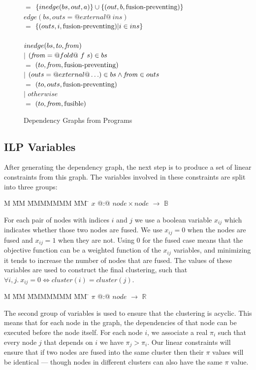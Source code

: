 \begin{figure}
\begin{tabbing}
    \> $=$    \> $\{inedge(bs, out, a) \}           \cup      \{(out, b, \mbox{fusion-preventing}) \}$ \\
$edge(bs, outs = @external@~ins)$  \\
    \> $=$    \> $\{(outs,i, \mbox{fusion-preventing}) | i \in ins \}$ \\
\\
$inedge(bs,to,\mathit{from})$ \\
    \> $|$ \> $(\mathit{from} = @fold@~f~s) \in bs$     \\
    \> $=$ \> $(to, \mathit{from}, \mbox{fusion-preventing})$  \\
    \> $|$ \> $(outs = @external@ \ldots) \in bs     \wedge \mathit{from} \in outs$     \\
    \> $=$ \> $(to, outs, \mbox{fusion-preventing})$  \\
    \> $|$ \> $otherwise$                      \\
    \> $=$ \> $(to, \mathit{from}, \mathrm{fusible})$
\end{tabbing}

\caption{Dependency Graphs from Programs}
\label{f:DependencyGraph}
\end{figure}


\eject
\subsection{ILP Variables}
After generating the dependency graph, the next step is to produce a set of linear constraints from this graph. The variables involved in these constraints are split into three groups:
\begin{tabbing}
M   \= MM \= MMMMMMM \= MM \= \kill
$x$   \> @:@  \> $node \times node$ \> $\to$ \> $\mathbb{B}$
\end{tabbing}
For each pair of nodes with indices $i$ and $j$ we use a boolean variable $x_{ij}$ which indicates whether those two nodes are fused. We use $x_{ij} = 0$ when the nodes are fused and $x_{ij} = 1$ when they are not. Using $0$ for the fused case means that the objective function can be a weighted function of the $x_{ij}$ variables, and minimizing it tends to increase the number of nodes that are fused. The values of these variables are used to construct the final clustering, such that $\forall i,j.\ x_{ij} = 0 \iff cluster(i) = cluster(j)$.
\begin{tabbing}
M   \= MM \= MMMMMMM \= MM \= \kill
$\pi$ \> @:@  \> $node$             \> $\to$ \> $\mathbb{R}$
\end{tabbing}
The second group of variables is used to ensure that the clustering is acyclic. This means that for each node in the graph, the dependencies of that node can be executed before the node itself. For each node $i$, we associate a real $\pi_i$ such that every node $j$ that depends on $i$ we have $\pi_j > \pi_i$. Our linear constraints will ensure that if two nodes are fused into the same cluster then their $\pi$ values will be identical --- though nodes in different clusters can also have the same $\pi$ value.

